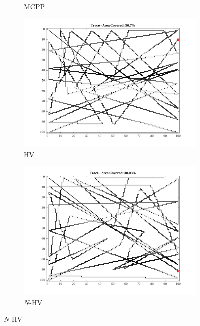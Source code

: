 \begin{figure}[htb!]
\begin{subfigure}[t]{0.25\textwidth}
        \captionsetup{skip=0.20\baselineskip,size=footnotesize}
        \caption{MCPP}
    \end{subfigure}%
    \begin{subfigure}[t]{0.25\textwidth}
        \centering
        \includegraphics[width=\linewidth]{figures/path_nhv_30p_100x100_sf_25_seed_2.png}
        \captionsetup{skip=0.20\baselineskip,size=footnotesize}
        \caption{HV}
    \end{subfigure}%
    \begin{subfigure}[t]{0.25\textwidth}
        \centering
        \includegraphics[width=\linewidth]{figures/path_nnhv_30p_100x100_sf_25_seed_2.png}
        \captionsetup{skip=0.20\baselineskip,size=footnotesize}
        \caption{$N$-HV}

\end{subfigure}
\end{figure}
